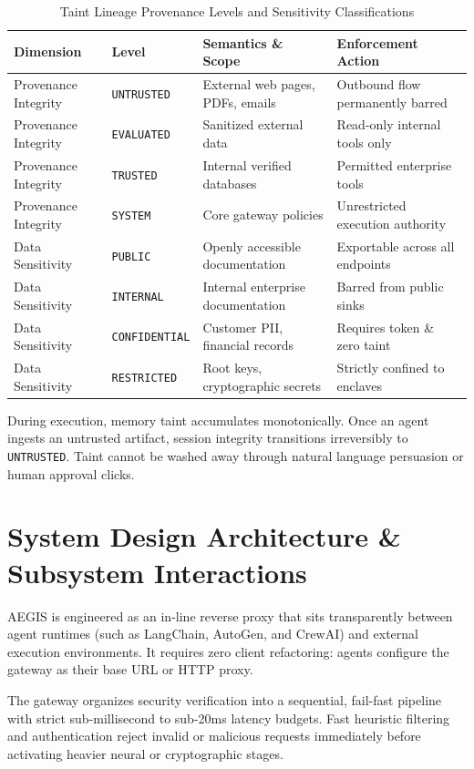 \begin{table}[htbp]
\centering
\caption{Taint Lineage Provenance Levels and Sensitivity Classifications}
\label{tab:lineage_class}
\begin{tabular}{l l p{5.0cm} p{4.5cm}}
\toprule
\textbf{Dimension} & \textbf{Level} & \textbf{Semantics \& Scope} & \textbf{Enforcement Action} \\
\midrule
Provenance Integrity & \texttt{UNTRUSTED} & External web pages, PDFs, emails & Outbound flow permanently barred \\
Provenance Integrity & \texttt{EVALUATED} & Sanitized external data & Read-only internal tools only \\
Provenance Integrity & \texttt{TRUSTED} & Internal verified databases & Permitted enterprise tools \\
Provenance Integrity & \texttt{SYSTEM} & Core gateway policies & Unrestricted execution authority \\
\midrule
Data Sensitivity & \texttt{PUBLIC} & Openly accessible documentation & Exportable across all endpoints \\
Data Sensitivity & \texttt{INTERNAL} & Internal enterprise documentation & Barred from public sinks \\
Data Sensitivity & \texttt{CONFIDENTIAL} & Customer PII, financial records & Requires token \& zero taint \\
Data Sensitivity & \texttt{RESTRICTED} & Root keys, cryptographic secrets & Strictly confined to enclaves \\
\bottomrule
\end{tabular}
\end{table}

During execution, memory taint accumulates monotonically. Once an agent ingests an untrusted artifact, session integrity transitions irreversibly to \texttt{UNTRUSTED}. Taint cannot be washed away through natural language persuasion or human approval clicks.

\section{System Design Architecture \& Subsystem Interactions}
AEGIS is engineered as an in-line reverse proxy that sits transparently between agent runtimes (such as LangChain, AutoGen, and CrewAI) and external execution environments. It requires zero client refactoring: agents configure the gateway as their base URL or HTTP proxy.

The gateway organizes security verification into a sequential, fail-fast pipeline with strict sub-millisecond to sub-20ms latency budgets. Fast heuristic filtering and authentication reject invalid or malicious requests immediately before activating heavier neural or cryptographic stages.


